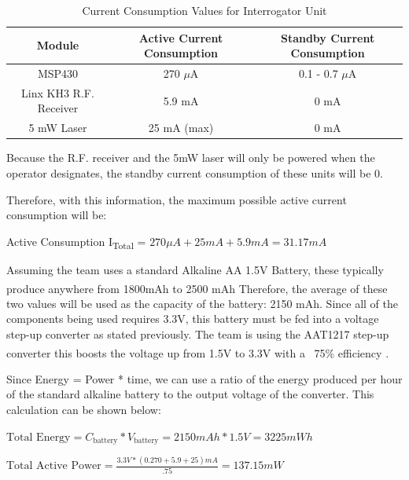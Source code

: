 \documentclass[letterpaper,10pt]{article}
\begin{document}
\begin{spacing}{1.15}
\begin{table}[htbp]
	\centering
	\begin{tabular}{c|c|c}	%
		\toprule	%
		Module & Active Current Consumption & Standby Current Consumption\\
		\midrule
		MSP430 & 270 $\mu$A & 0.1 - 0.7 $\mu$A\\ 
		Linx KH3 R.F. Receiver & 5.9 mA & 0 mA\\
		5 mW Laser & 25 mA (max) & 0 mA \\
	\bottomrule	%
	\end{tabular}%
	\caption{Current Consumption Values for Interrogator Unit}
	\label{tab:table2}	%
\end{table}%

Because the R.F. receiver and the 5mW laser will only be powered when the operator designates, the standby current consumption of these units will be 0.

Therefore, with this information, the maximum possible active current consumption will be:
\begin{center}{Active Consumption I\textsubscript{Total} = $270 \mu A + 25 mA + 5.9 mA = 31.17 mA $}\end{center}

Assuming the team uses a standard Alkaline AA 1.5V Battery, these typically produce anywhere from 1800mAh to 2500 mAh \textsuperscript{\cite{Battery}} Therefore, the average of these two values will be used as the capacity of the battery: 2150 mAh. Since all of the components being used requires 3.3V, this battery must be fed into a voltage step-up converter as stated previously. The team is using the AAT1217 step-up converter this boosts the voltage up from 1.5V to 3.3V with a ~75\% efficiency \textsuperscript{\cite{AAT1217}}.

Since Energy = Power * time, we can use a ratio of the energy produced per hour of the standard alkaline battery to the output voltage of the converter. This calculation can be shown below:



\begin{center} 
	$\textrm{Total Energy} = C_\textrm{battery} * V_\textrm{battery} = 2150 mAh * 1.5V = 3225 mWh$
	
	$\textrm{Total Active Power} = \frac{3.3 V * (0.270 + 5.9 + 25) mA}{.75} = 137.15mW$ 
	

\end{center}
\end{spacing}
\end{document}
